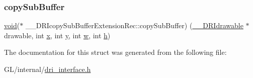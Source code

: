 \mbox{\label{struct_____d_r_icopy_sub_buffer_extension_rec_a54603b471dc4e14aa04ecb05f3459b47}} 
\subsubsection{\texorpdfstring{copy\+Sub\+Buffer}{copySubBuffer}}
{\footnotesize\ttfamily \hyperlink{_s_d_l__opengles2__gl2ext_8h_ae5d8fa23ad07c48bb609509eae494c95}{void}($\ast$ \+\_\+\+\_\+\+D\+R\+Icopy\+Sub\+Buffer\+Extension\+Rec\+::copy\+Sub\+Buffer) (\hyperlink{dri__interface_8h_a5bfb832a0a08208d95b3bbef439d2262}{\+\_\+\+\_\+\+D\+R\+Idrawable} $\ast$drawable, int \hyperlink{gl_8h_ad0e63d0edcdbd3d79554076bf309fd47}{x}, int \hyperlink{gl_8h_a1675d9d7bb68e1657ff028643b4037e3}{y}, int \hyperlink{glcorearb_8h_a6ee8f168a7ab6785a9bb57c6715dad99}{w}, int \hyperlink{glcorearb_8h_afa0fb1b5e976920c0abeff2dca3ed774}{h})}



The documentation for this struct was generated from the following file\+:\begin{DoxyCompactItemize}
\item 
G\+L/internal/\hyperlink{dri__interface_8h}{dri\+\_\+interface.\+h}\end{DoxyCompactItemize}
